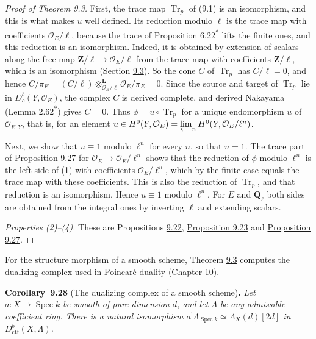 \documentclass[11pt]{article}
\newenvironment{bpstatement}[2]{\par\addvspace{0.6\baselineskip}\noindent\textbf{#1}#2\textbf{.}\enspace\ignorespaces}
  {\par\addvspace{0.4\baselineskip}}
\newenvironment{bpstatementit}[2]{\begin{bpstatement}{#1}{#2}\itshape\ignorespaces}{\end{bpstatement}}
\newcommand{\bpout}[1]{#1\textsuperscript{\hyperlink{bp-outside}{\ensuremath{\ast}}}}
\providecommand{\Dbc}{}\renewcommand{\Dbc}{D^b_c}
\begin{document}
\begin{proof}[{Proof of Theorem 9.3}]
First, the trace map \(\operatorname{Tr}_p\) of (9.1) is an isomorphism, and this is what makes \(u\) well defined. Its reduction modulo \(\ell\) is the trace map with coefficients \(\mathcal O_E/\ell\), because the trace of Proposition \bpout{6.22} lifts the finite ones, and this reduction is an isomorphism. Indeed, it is obtained by extension of scalars along the free map \(\mathbf Z/\ell\to\mathcal O_E/\ell\) from the trace map with coefficients \(\mathbf Z/\ell\), which is an isomorphism (Section \hyperref[bp17]{9.3}). So the cone \(C\) of \(\operatorname{Tr}_p\) has \(C/\ell=0\), and hence \(C/\pi_E=(C/\ell)\otimes^{\mathbf L}_{\mathcal O_E/\ell}\mathcal O_E/\pi_E=0\). Since the source and target of \(\operatorname{Tr}_p\) lie in \(\Dbc(Y,\mathcal O_E)\), the complex \(C\) is derived complete, and derived Nakayama (Lemma \bpout{2.62}) gives \(C=0\). Thus \(\phi=u\circ\operatorname{Tr}_p\) for a unique endomorphism \(u\) of \(\mathcal O_{E,Y}\), that is, for an element \(u\in H^0(Y,\mathcal O_E)=\varprojlim_nH^0(Y,\mathcal O_E/\ell^n)\).

Next, we show that \(u\equiv1\) modulo \(\ell^n\) for every \(n\), so that \(u=1\). The trace part of Proposition \hyperref[bp92]{9.27} for \(\mathcal O_E\to\mathcal O_E/\ell^n\) shows that the reduction of \(\phi\) modulo \(\ell^n\) is the left side of (1) with coefficients \(\mathcal O_E/\ell^n\), which by the finite case equals the trace map with these coefficients. This is also the reduction of \(\operatorname{Tr}_p\), and that reduction is an isomorphism. Hence \(u\equiv1\) modulo \(\ell^n\). For \(E\) and \(\overline{\mathbf Q}_\ell\) both sides are obtained from the integral ones by inverting \(\ell\) and extending scalars.

\emph{Properties (2)–(4).} These are Propositions \hyperref[bp78]{9.22}, \hyperref[bp81]{Proposition 9.23} and \hyperref[bp92]{Proposition 9.27}.
\end{proof}

\label{bp97}%
For the structure morphism of a smooth scheme, Theorem \hyperref[bp11]{9.3} computes the dualizing complex used in Poincaré duality (Chapter \hyperref[bp101]{10}).

\label{bp98}%
\begin{bpstatementit}{Corollary~9.28}{ (The dualizing complex of a smooth scheme)}
Let \(a:X\to\operatorname{Spec}k\) be smooth of pure dimension \(d\), and let \(\Lambda\) be any admissible coefficient ring. There is a natural isomorphism \(a^!\Lambda_{\operatorname{Spec}k}\simeq\Lambda_X(d)[2d]\) in \(D^b_{\mathrm{ctf}}(X,\Lambda)\).
\end{bpstatementit}
\end{document}
